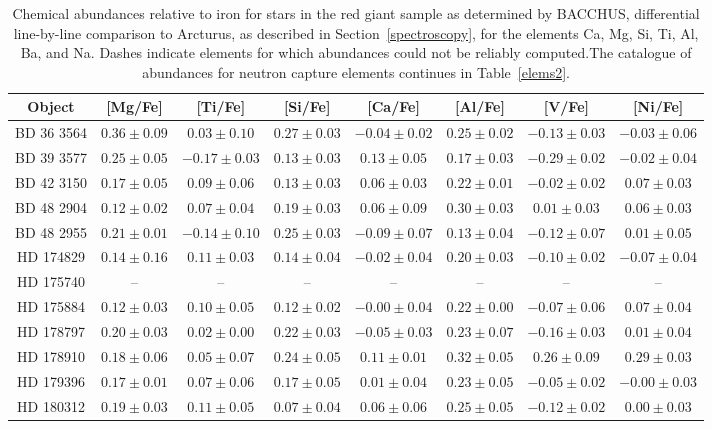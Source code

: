 \begin{table*}
\caption{Chemical abundances relative to iron for stars in the red giant sample as determined by BACCHUS,  differential line-by-line comparison to Arcturus, as described in Section~\ref{spectroscopy}, for the elements Ca, Mg, Si, Ti, Al, Ba, and Na. Dashes indicate elements for which abundances could not be reliably computed.The catalogue of abundances for neutron capture elements continues in Table~\ref{elems2}.\label{elems1}}
\begin{tabular}{cccccccc}
\hline \hline
Object & [Mg/Fe] & [Ti/Fe] & [Si/Fe] & [Ca/Fe] & [Al/Fe] & [V/Fe] & [Ni/Fe] \\
\hline
BD 36 3564 & $0.36 \pm 0.09$ & $0.03 \pm 0.10$ & $0.27 \pm 0.03$ & $-0.04 \pm 0.02$ & $0.25 \pm 0.02$ & $-0.13 \pm 0.03$ & $-0.03 \pm 0.06$ \\
BD 39 3577 & $0.25 \pm 0.05$ & $-0.17 \pm 0.03$ & $0.13 \pm 0.03$ & $0.13 \pm 0.05$ & $0.17 \pm 0.03$ & $-0.29 \pm 0.02$ & $-0.02 \pm 0.04$ \\
BD 42 3150 & $0.17 \pm 0.05$ & $0.09 \pm 0.06$ & $0.13 \pm 0.03$ & $0.06 \pm 0.03$ & $0.22 \pm 0.01$ & $-0.02 \pm 0.02$ & $0.07 \pm 0.03$ \\
BD 48 2904 & $0.12 \pm 0.02$ & $0.07 \pm 0.04$ & $0.19 \pm 0.03$ & $0.06 \pm 0.09$ & $0.30 \pm 0.03$ & $0.01 \pm 0.03$ & $0.06 \pm 0.03$ \\
BD 48 2955 & $0.21 \pm 0.01$ & $-0.14 \pm 0.10$ & $0.25 \pm 0.03$ & $-0.09 \pm 0.07$ & $0.13 \pm 0.04$ & $-0.12 \pm 0.07$ & $0.01 \pm 0.05$ \\
HD 174829 & $0.14 \pm 0.16$ & $0.11 \pm 0.03$ & $0.14 \pm 0.04$ & $-0.02 \pm 0.04$ & $0.20 \pm 0.03$ & $-0.10 \pm 0.02$ & $-0.07 \pm 0.04$ \\
HD 175740 & -- & -- & -- & -- & -- & -- & -- \\
HD 175884 & $0.12 \pm 0.03$ & $0.10 \pm 0.05$ & $0.12 \pm 0.02$ & $-0.00 \pm 0.04$ & $0.22 \pm 0.00$ & $-0.07 \pm 0.06$ & $0.07 \pm 0.04$ \\
HD 178797 & $0.20 \pm 0.03$ & $0.02 \pm 0.00$ & $0.22 \pm 0.03$ & $-0.05 \pm 0.03$ & $0.23 \pm 0.07$ & $-0.16 \pm 0.03$ & $0.01 \pm 0.04$ \\
HD 178910 & $0.18 \pm 0.06$ & $0.05 \pm 0.07$ & $0.24 \pm 0.05$ & $0.11 \pm 0.01$ & $0.32 \pm 0.05$ & $0.26 \pm 0.09$ & $0.29 \pm 0.03$ \\
HD 179396 & $0.17 \pm 0.01$ & $0.07 \pm 0.06$ & $0.17 \pm 0.05$ & $0.01 \pm 0.04$ & $0.23 \pm 0.05$ & $-0.05 \pm 0.02$ & $-0.00 \pm 0.03$ \\
HD 180312 & $0.19 \pm 0.03$ & $0.11 \pm 0.05$ & $0.07 \pm 0.04$ & $0.06 \pm 0.06$ & $0.25 \pm 0.05$ & $-0.12 \pm 0.02$ & $0.00 \pm 0.03$ \\

\end{tabular}
\end{table*}
